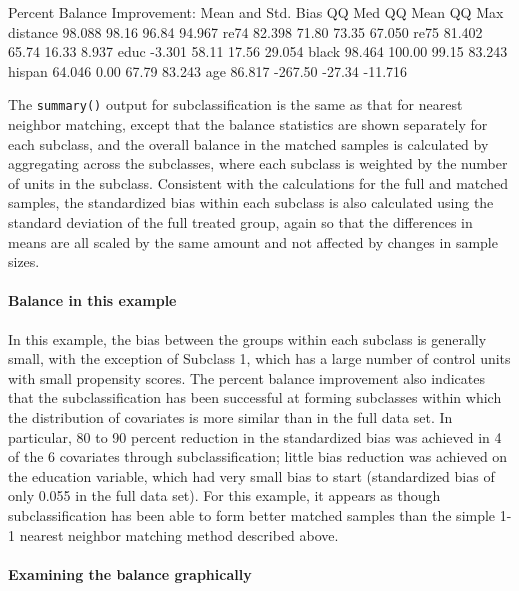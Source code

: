 \documentclass[oneside,letterpaper,titlepage]{article}
\begin{document}
\begin{Schunk}
\begin{Soutput}
Percent Balance Improvement:
         Mean and Std. Bias  QQ Med QQ Mean  QQ Max
distance             98.088   98.16   96.84  94.967
re74                 82.398   71.80   73.35  67.050
re75                 81.402   65.74   16.33   8.937
educ                 -3.301   58.11   17.56  29.054
black                98.464  100.00   99.15  83.243
hispan               64.046    0.00   67.79  83.243
age                  86.817 -267.50  -27.34 -11.716
\end{Soutput}
\end{Schunk}
The \texttt{summary()} output for subclassification is the same as that
for nearest neighbor matching, except that the balance statistics are
shown separately for each subclass, and the overall balance in the
matched samples is calculated by aggregating across the subclasses,
where each subclass is weighted by the number of units in the
subclass.  Consistent with the calculations for the full and matched
samples, the standardized bias within each subclass is also calculated
using the standard deviation of the full treated group, again so that
the differences in means are all scaled by the same amount and not
affected by changes in sample sizes.

\paragraph{Balance in this example}

In this example, the bias between the groups within each subclass is
generally small, with the exception of Subclass 1, which has a large
number of control units with small propensity scores.  The percent
balance improvement also indicates that the subclassification has been
successful at forming subclasses within which the distribution of
covariates is more similar than in the full data set.  In particular,
80 to 90 percent reduction in the standardized bias was achieved in 4
of the 6 covariates through subclassification; little bias reduction
was achieved on the education variable, which had very small bias to
start (standardized bias of only 0.055 in the full data set).  For
this example, it appears as though subclassification has been able to
form better matched samples than the simple 1-1 nearest neighbor
matching method described above.

\paragraph{Examining the balance graphically}
\end{document}
